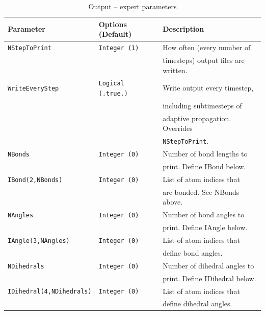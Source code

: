 \documentclass[11pt]{article}
\begin{document}
\begin{table}[h]
\caption{Output -- expert parameters}
\begin{tabular}{ l l l }
\hline\hline
Parameter & Options (Default)& Description \\
\hline
{\tt NStepToPrint}           & {\tt Integer (1)}      & {\small How often (every number of}\\&&
                                                        {\small timesteps) output files are written.}\\
{\tt WriteEveryStep}         & {\tt Logical (.true.)} & {\small Write output every timestep,}\\&&
                                                        {\small including subtimesteps of}\\&&
                                                        {\small adaptive propagation. Overrides}\\&&
                                                        {\small {\tt NStepToPrint}.}\\
{\tt NBonds}                 & {\tt Integer (0)}      & {\small Number of bond lengths to}\\&&
                                                        {\small print. Define IBond below.}\\
{\tt IBond(2,NBonds)}        & {\tt Integer (0)}      & {\small List of atom indices that}\\&&
                                                        {\small are bonded. See NBonds above.}\\
{\tt NAngles}                & {\tt Integer (0)}      & {\small Number of bond angles to}\\&&
                                                        {\small print. Define IAngle below.}\\
{\tt IAngle(3,NAngles)}      & {\tt Integer (0)}      & {\small List of atom indices that}\\&&
                                                        {\small define bond angles.}\\
{\tt NDihedrals}             & {\tt Integer (0)}      & {\small Number of dihedral angles to}\\&&
                                                        {\small print. Define IDihedral below.}\\
{\tt IDihedral(4,NDihedrals)}& {\tt Integer (0)}      & {\small List of atom indices that}\\&&
                                                        {\small define dihedral angles.}\\ 

\end{tabular}
\end{table}
\end{document}

